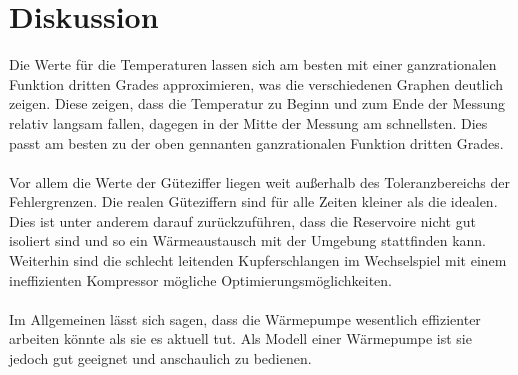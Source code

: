 \section{Diskussion}
Die Werte für die Temperaturen lassen sich am besten mit einer ganzrationalen
Funktion dritten Grades approximieren, was die verschiedenen Graphen deutlich zeigen.
Diese zeigen, dass die Temperatur zu Beginn und zum Ende der Messung relativ langsam
fallen, dagegen in der Mitte der Messung am schnellsten. Dies passt am besten zu der
oben gennanten ganzrationalen Funktion dritten Grades.
\\
\\
Vor allem die Werte der Güteziffer liegen weit außerhalb des Toleranzbereichs
der Fehlergrenzen. Die realen Güteziffern sind für alle Zeiten kleiner als die
idealen. Dies ist unter anderem darauf zurückzuführen, dass die Reservoire nicht
gut isoliert sind und so ein Wärmeaustausch mit der Umgebung stattfinden kann.
Weiterhin sind die schlecht leitenden Kupferschlangen im Wechselspiel mit einem
ineffizienten Kompressor mögliche Optimierungsmöglichkeiten.
\\
\\
Im Allgemeinen lässt sich sagen, dass die Wärmepumpe wesentlich effizienter arbeiten
könnte als sie es aktuell tut. Als Modell einer Wärmepumpe ist sie jedoch gut geeignet
und anschaulich zu bedienen.
\newpage
\nocite{*}
\printbibliography
